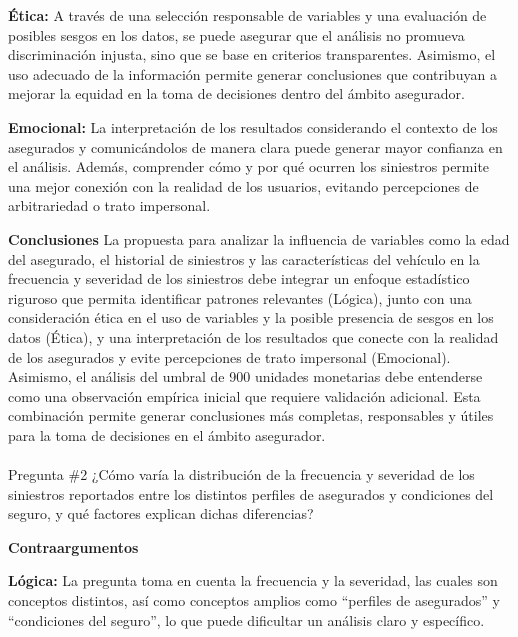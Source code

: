 \documentclass[
  spanish,
  11pt,
  letterpaper,
]{article}
\makeatletter
\let\oldparagraph\paragraph
\renewcommand{\paragraph}{
    \@ifstar
      \xxxParagraphStar
      \xxxParagraphNoStar
  }
\newcommand{\xxxParagraphStar}[1]{\oldparagraph*{#1}\mbox{}}
\newcommand{\xxxParagraphNoStar}[1]{\oldparagraph{#1}\mbox{}}
\makeatother
\begin{document}
\textbf{Ética:} A través de una selección responsable de variables y una
evaluación de posibles sesgos en los datos, se puede asegurar que el
análisis no promueva discriminación injusta, sino que se base en
criterios transparentes. Asimismo, el uso adecuado de la información
permite generar conclusiones que contribuyan a mejorar la equidad en la
toma de decisiones dentro del ámbito asegurador.

\textbf{Emocional:} La interpretación de los resultados considerando el
contexto de los asegurados y comunicándolos de manera clara puede
generar mayor confianza en el análisis. Además, comprender cómo y por
qué ocurren los siniestros permite una mejor conexión con la realidad de
los usuarios, evitando percepciones de arbitrariedad o trato impersonal.

\textbf{Conclusiones} La propuesta para analizar la influencia de
variables como la edad del asegurado, el historial de siniestros y las
características del vehículo en la frecuencia y severidad de los
siniestros debe integrar un enfoque estadístico riguroso que permita
identificar patrones relevantes (Lógica), junto con una consideración
ética en el uso de variables y la posible presencia de sesgos en los
datos (Ética), y una interpretación de los resultados que conecte con la
realidad de los asegurados y evite percepciones de trato impersonal
(Emocional). Asimismo, el análisis del umbral de 900 unidades monetarias
debe entenderse como una observación empírica inicial que requiere
validación adicional. Esta combinación permite generar conclusiones más
completas, responsables y útiles para la toma de decisiones en el ámbito
asegurador.

\paragraph{Pregunta \#2 ¿Cómo varía la distribución de la frecuencia y
severidad de los siniestros reportados entre los distintos perfiles de
asegurados y condiciones del seguro, y qué factores explican dichas
diferencias?}\label{pregunta-2-cuxf3mo-varuxeda-la-distribuciuxf3n-de-la-frecuencia-y-severidad-de-los-siniestros-reportados-entre-los-distintos-perfiles-de-asegurados-y-condiciones-del-seguro-y-quuxe9-factores-explican-dichas-diferencias}

\textbf{Contraargumentos}

\textbf{Lógica:} La pregunta toma en cuenta la frecuencia y la
severidad, las cuales son conceptos distintos, así como conceptos
amplios como ``perfiles de asegurados'' y ``condiciones del seguro'', lo
que puede dificultar un análisis claro y específico.
\end{document}
